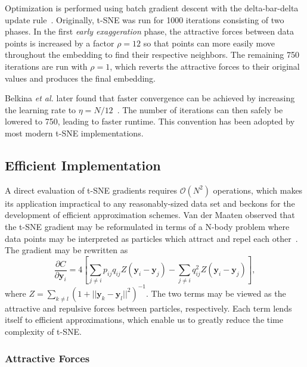 \documentclass[twocolumn]{bmcart}
\begin{document}
Optimization is performed using batch gradient descent with the delta-bar-delta update rule~\cite{jacobs1988increased}. Originally, t-SNE was run for 1000 iterations consisting of two phases. In the first \textit{early exaggeration} phase, the attractive forces between data points is increased by a factor $\rho=12$ so that points can more easily move throughout the embedding to find their respective neighbors. The remaining 750 iterations are run with $\rho=1$, which reverts the attractive forces to their original values and produces the final embedding.

Belkina \textit{et al.} later found that faster convergence can be achieved by increasing the learning rate to $\eta=N/12$~\cite{belkina2019automated}. The number of iterations can then safely be lowered to 750, leading to faster runtime. This convention has been adopted by most modern t-SNE implementations.

\subsection*{Efficient Implementation}
A direct evaluation of t-SNE gradients requires $\mathcal{O}(N^2)$ operations, which makes its application impractical to any reasonably-sized data set and beckons for the development of efficient approximation schemes. Van der Maaten observed that the t-SNE gradient may be reformulated in terms of a N-body problem where data points may be interpreted as particles which attract and repel each other~\cite{van2014accelerating}. The gradient may be rewritten as
\begin{equation}
\frac{\partial C}{\partial \mathbf{y}_i} = 4 \left [ \sum_{j \neq i} p_{ij} q_{ij} Z \left ( \mathbf{y}_i - \mathbf{y}_j \right ) -\sum_{j \neq i} q_{ij}^2 Z \left ( \mathbf{y}_i - \mathbf{y}_j \right ) \right ], \label{eq:grad_attr_rep}
\end{equation}
where $Z = \sum_{k \neq l}\left ( 1 + || \mathbf{y}_k - \mathbf{y}_l ||^2 \right )^{-1}$. The two terms may be viewed as the attractive and repulsive forces between particles, respectively. Each term lends itself to efficient approximations, which enable us to greatly reduce the time complexity of t-SNE.

\subsubsection*{Attractive Forces}
\end{document}
